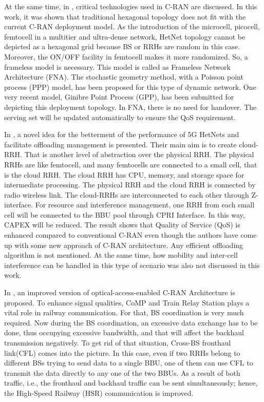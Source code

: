 \begin{multicols}{2}
At the same time, in \cite{art3-key25}, critical technologies used in C-RAN are discussed. In this work, it was shown that traditional hexagonal topology does not fit with the current C-RAN deployment model. As the introduction of the microcell, picocell, femtocell in a multitier and ultra-dense network, HetNet topology cannot be depicted as a hexagonal grid because BS or RRHs are random in this case. Moreover, the ON/OFF facility in femtocell makes it more randomized. So, a frameless model is necessary. This model is called as Frameless Network Architecture (FNA). The stochastic geometry method, with a Poisson point process (PPP) model, has been proposed for this type of dynamic network. One very recent model, Ginibre Point Process (GPP), has been submitted for depicting this deployment topology. In FNA, there is no need for handover. The serving set will be updated automatically to ensure the QoS requirement.

In \cite{art3-key26}, a novel idea for the betterment of the performance of 5G HetNets and facilitate offloading management is presented. Their main aim is to create cloud-RRH. That is another level of abstraction over the physical RRH. The physical RRHs are like femtocell, and many femtocells are connected to a small cell, that is the cloud RRH. The cloud RRH has CPU, memory, and storage space for intermediate processing. The physical RRH and the cloud RRH is connected by radio wireless link. The cloud-RRHs are interconnected to each other through Z-interface. For resource and interference management, one RRH from each small cell will be connected to the BBU pool through CPRI Interface. In this way, CAPEX will be reduced. The result shows that Quality of Service (QoS) is enhanced compared to conventional C-RAN even though the authors have come up with some new approach of C-RAN architecture. Any efficient offloading algorithm is not mentioned. At the same time, how mobility and inter-cell interference can be handled in this type of scenario was also not discussed in this work.

In \cite{art3-key27}, an improved version of optical-access-enabled C-RAN Architecture is proposed. To enhance signal qualities, CoMP and Train Relay Station plays a vital role in railway communication. For that, BS coordination is very much required. Now during the BS coordination, an excessive data exchange has to be done, thus occupying excessive bandwidth, and that will affect the backhaul transmission negatively. To get rid of that situation, Cross-BS fronthaul link(CFL) comes into the picture. In this case, even if two RRHs belong to different BSs trying to send data to a single BBU, one of them can use CFL to transmit the data directly to any one of the two BBUs. As a result of both traffic, i.e., the fronthaul and backhaul traffic can be sent simultaneously; hence, the High-Speed Railway (HSR) communication is improved.


\end{multicols}
